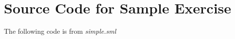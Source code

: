 \documentclass{report}
\begin{document}

\appendix{} 


\renewcommand{\thechapter}{\Alph{chapter}} 

\chapter{Source Code for Sample Exercise}
\label{cha:source-code-sample}

The following code is from \emph{simple.sml}

\end{document}
